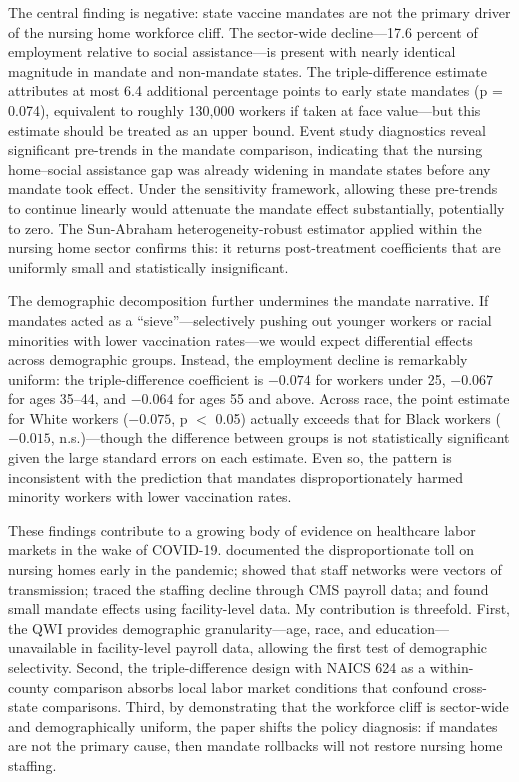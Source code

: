 \documentclass[12pt]{article}
\begin{document}
The central finding is negative: state vaccine mandates are not the primary driver of the nursing home workforce cliff. The sector-wide decline---17.6 percent of employment relative to social assistance---is present with nearly identical magnitude in mandate and non-mandate states. The triple-difference estimate attributes at most 6.4 additional percentage points to early state mandates (p = 0.074), equivalent to roughly 130,000 workers if taken at face value---but this estimate should be treated as an upper bound. Event study diagnostics reveal significant pre-trends in the mandate comparison, indicating that the nursing home--social assistance gap was already widening in mandate states before any mandate took effect. Under the \citet{rambachan2023more} sensitivity framework, allowing these pre-trends to continue linearly would attenuate the mandate effect substantially, potentially to zero. The Sun-Abraham heterogeneity-robust estimator \citep{sun2021estimating} applied within the nursing home sector confirms this: it returns post-treatment coefficients that are uniformly small and statistically insignificant.

The demographic decomposition further undermines the mandate narrative. If mandates acted as a ``sieve''---selectively pushing out younger workers or racial minorities with lower vaccination rates---we would expect differential effects across demographic groups. Instead, the employment decline is remarkably uniform: the triple-difference coefficient is $-0.074$ for workers under 25, $-0.067$ for ages 35--44, and $-0.064$ for ages 55 and above. Across race, the point estimate for White workers ($-0.075$, p $<$ 0.05) actually exceeds that for Black workers ($-0.015$, n.s.)---though the difference between groups is not statistically significant given the large standard errors on each estimate. Even so, the pattern is inconsistent with the prediction that mandates disproportionately harmed minority workers with lower vaccination rates.

These findings contribute to a growing body of evidence on healthcare labor markets in the wake of COVID-19. \citet{grabowski2020nursing} documented the disproportionate toll on nursing homes early in the pandemic; \citet{chen2021nursing} showed that staff networks were vectors of transmission; \citet{shen2022staffing} traced the staffing decline through CMS payroll data; and \citet{gandhi2023vaccine} found small mandate effects using facility-level data. My contribution is threefold. First, the QWI provides demographic granularity---age, race, and education---unavailable in facility-level payroll data, allowing the first test of demographic selectivity. Second, the triple-difference design with NAICS 624 as a within-county comparison absorbs local labor market conditions that confound cross-state comparisons. Third, by demonstrating that the workforce cliff is sector-wide and demographically uniform, the paper shifts the policy diagnosis: if mandates are not the primary cause, then mandate rollbacks will not restore nursing home staffing.
\end{document}
